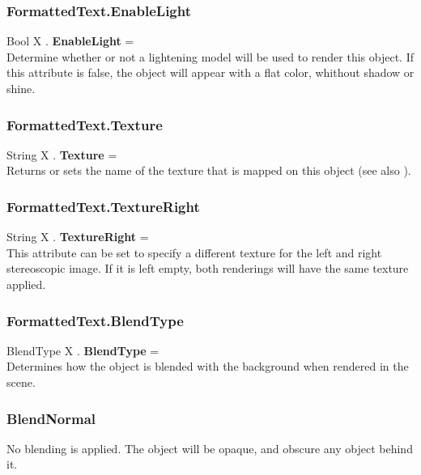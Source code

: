\subsubsection{FormattedText.EnableLight \label{F:FormattedText:EnableLight}}
Bool X . \textbf{EnableLight} = \\
Determine whether or not a lightening model will be used to render this object. If this attribute is false, the object will appear with a flat color, whithout shadow or shine.

\subsubsection{FormattedText.Texture \label{F:FormattedText:Texture}}
String X . \textbf{Texture} = \\
Returns or sets the name of the texture that is mapped on this object (see also ).

\subsubsection{FormattedText.TextureRight \label{F:FormattedText:TextureRight}}
String X . \textbf{TextureRight} = \\
This attribute can be set to specify a different texture for the left and right stereoscopic image. If it is left empty, both renderings will have the same texture applied.

\subsubsection{FormattedText.BlendType \label{F:FormattedText:BlendType}}
BlendType X . \textbf{BlendType} = \\
Determines how the object is blended with the background when rendered in the scene.

\subsubsection{BlendNormal \label{T:BlendType|BlendNormal}}
No blending is applied. The object will be opaque, and obscure any object behind it.

